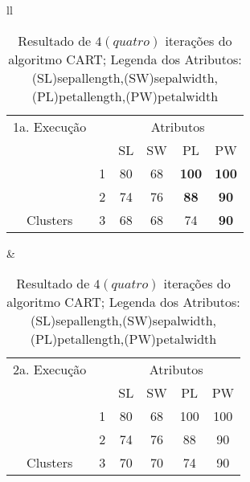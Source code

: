 \begin{table}[!h]
\caption{Resultado de ${4(quatro)}$ iterações do algoritmo CART; Legenda dos Atributos: (SL)sepallength,(SW)sepalwidth,(PL)petallength,(PW)petalwidth}
 \begin{tabular}{ll}

  
   \small\addtolength{\tabcolsep}{-1pt}
     \begin{tabular}{|cl|c|c|c|c|}
        \hline \hline
                  1a. Execução   &   & \multicolumn{4}{c|}{Atributos}                                               \\ \cline{3-6} 
       \multicolumn{1}{|l}{}                             &   & SL   & SW     & PL    & PW      \\ \hline
        \multicolumn{1}{|c|}{}                           & 1 & 80   & 68     & \textbf{100}   & \textbf{100}       \\ \cline{2-6} 
        \multicolumn{1}{|c|}{}                           & 2 & 74 & 76   & \textbf{88}  & \textbf{90}     \\ \cline{2-6} 
        \multicolumn{1}{|c|}{\multirow{-3}{*}{Clusters}} & 3 & 68 & 68   & 74  & \textbf{90}     \\ \hline
      \end{tabular}
 &
 
   
  \small\addtolength{\tabcolsep}{-1pt}
     \begin{tabular}{|cl|c|c|c|c|}
        \hline \hline
         2a. Execução         &   & \multicolumn{4}{c|}{Atributos}                                               \\ \cline{3-6} 
       \multicolumn{1}{|l}{}                             &   & SL   & SW     & PL    & PW      \\ \hline
        \multicolumn{1}{|c|}{}                           & 1 & 80 & 68   & 100 &  100      \\ \cline{2-6} 
        \multicolumn{1}{|c|}{}                           & 2 & 74 & 76   & 88  &    90  \\ \cline{2-6} 
        \multicolumn{1}{|c|}{\multirow{-3}{*}{Clusters}} & 3 & 70 & 70   & 74  &  90    \\ \hline
      \end{tabular}
  \\  [8ex]
 

\end{tabular}
\end{table}

